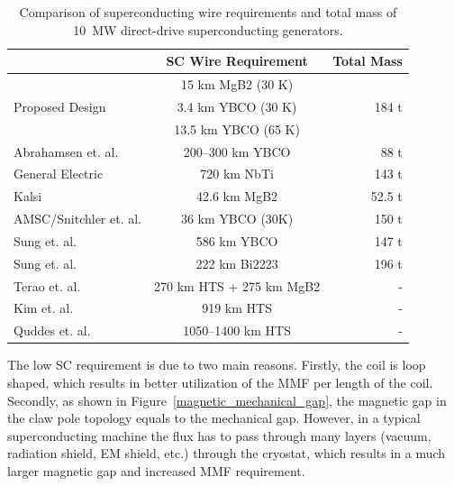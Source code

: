 \documentclass[12pt]{iopart}
\begin{document}
\begin{table}[]
\caption{Comparison of superconducting wire requirements and total mass of 10~MW direct-drive superconducting generators.}
\label{SC_length_compare}
\centering
\begin{tabular}{lcr}
\hline
 & SC Wire Requirement & Total Mass \\
\hline
		& 15 km MgB2 (30 K) & \\
Proposed Design	& 3.4 km YBCO (30 K) & 184 t\\
 		& 13.5 km YBCO (65 K) & \\
\hline
\hline
Abrahamsen et. al. \cite{Abrahamsen2010} & 200--300 km YBCO &88 t\\
General Electric \cite{Fair2012} & 720 km NbTi & 143 t \\
Kalsi \cite{Kalsi2013} & 42.6 km MgB2 & 52.5 t \\
AMSC/Snitchler et. al. \cite{Snitchler2011}  & 36 km YBCO (30K) & 150 t \\
Sung et. al. \cite{Sung2013} & 586 km YBCO & 147 t \\
Sung et. al. \cite{Sung2013}& 222 km Bi2223 & 196 t \\
Terao et. al. \cite{Terao2012} & 270 km HTS + 275 km MgB2 & - \\
Kim et. al. \cite{Song2012}& 919 km HTS & - \\
Quddes et. al. \cite{Quddes2011} & 1050--1400 km HTS & - \\
\hline
\end{tabular}
\end{table}

The low SC requirement is due to two main reasons. Firstly, the coil is loop shaped, which results in better utilization of the MMF per length of the coil. Secondly, as shown in Figure~\ref{magnetic_mechanical_gap}, the magnetic gap in the claw pole topology equals to the mechanical gap. However, in a typical superconducting machine the flux has to pass through many layers (vacuum, radiation shield, EM shield, etc.) through the cryostat, which results in a much larger magnetic gap and increased MMF requirement.
\end{document}
